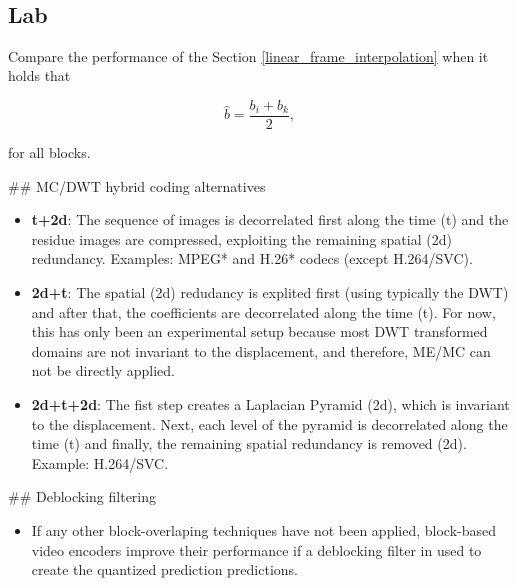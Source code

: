 {\begin{enumerate}
    \begin{center}
    \end{center}
    { \hspace*{\fill} \\}
    
    \hypertarget{lab}{%
\subsection{Lab}\label{lab}}

Compare the performance of the Section \ref{linear_frame_interpolation}
when it holds that

\begin{equation}
   \hat{b} = \frac{b_i + b_k}{2},
\end{equation}

for all blocks.

    \#\# MC/DWT hybrid coding alternatives

\begin{itemize}
\item
  \textbf{t+2d}: The sequence of images is decorrelated first along the
  time (t) and the residue images are compressed, exploiting the
  remaining spatial (2d) redundancy. Examples: MPEG* and H.26* codecs
  (except H.264/SVC).
\item
  \textbf{2d+t}: The spatial (2d) redudancy is explited first (using
  typically the DWT) and after that, the coefficients are decorrelated
  along the time (t). For now, this has only been an experimental setup
  because most DWT transformed domains are not invariant to the
  displacement, and therefore, ME/MC can not be directly applied.
\item
  \textbf{2d+t+2d}: The fist step creates a Laplacian Pyramid (2d),
  which is invariant to the displacement. Next, each level of the
  pyramid is decorrelated along the time (t) and finally, the remaining
  spatial redundancy is removed (2d). Example: H.264/SVC.
\end{itemize}

    \#\# Deblocking filtering

\begin{itemize}
\tightlist
\item
  If any other block-overlaping techniques have not been applied,
  block-based video encoders improve their performance if a deblocking
  filter in used to create the quantized prediction predictions.
\end{itemize}


\end{enumerate}}
